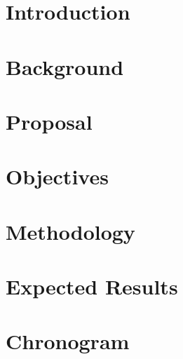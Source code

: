 \documentclass[mestrado]{pacotes/unb-cic}
\begin{document}
\tableofcontents
\listoffigures

\textual

\chapter{Introduction}


%

\chapter{Background}

%
%
%




\chapter{Proposal}



\chapter{Objectives}

\chapter{Methodology}

\chapter{Expected Results}

\chapter{Chronogram}


\postextual
\anexos




\end{document}
